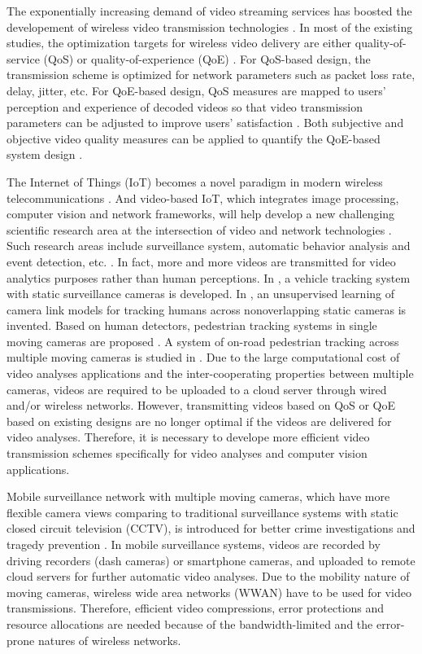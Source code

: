 \documentclass[journal]{IEEEtran}
\begin{document}
The exponentially increasing demand of video streaming services has boosted the developement of wireless video transmission technologies \cite{Hwan09}. In most of the existing studies, the optimization targets for wireless video delivery are either quality-of-service (QoS) \cite{Hwan09,EhHa12,KPKG15} or quality-of-experience (QoE) \cite{CHLC15,CHWL14,CDHR15,SHJE13,YaFA15}. For QoS-based design, the transmission scheme is optimized for network parameters such as packet loss rate, delay, jitter, etc. For QoE-based design, QoS measures are mapped to users' perception and experience of decoded videos so that video transmission parameters can be adjusted to improve users' satisfaction \cite{FiHT10}. Both subjective and objective video quality measures can be applied to quantify the QoE-based system design \cite{MSSB10}.

The Internet of Things (IoT) becomes a novel paradigm in modern wireless telecommunications \cite{AtIM10}. And video-based IoT, which integrates image processing, computer vision and network frameworks, will help develop a new challenging scientific research area at the intersection of video and network technologies \cite{GBMP13}. Such research areas include surveillance system, automatic behavior analysis and event detection, etc. \cite{GBMP13}. In fact, more and more videos are transmitted for video analytics purposes rather than human perceptions. In \cite{LeHC15}, a vehicle tracking system with static surveillance cameras is developed. In \cite{ChHw14}, an unsupervised learning of camera link models for tracking humans across nonoverlapping static cameras is invented. Based on human detectors, pedestrian tracking systems in single moving cameras are proposed \cite{LHOP14,HWLH15}. A system of on-road pedestrian tracking across multiple moving cameras is studied in \cite{LeHw15}. Due to the large computational cost of video analyses applications and the inter-cooperating properties between multiple cameras, videos are required to be uploaded to a cloud server through wired and/or wireless networks. However, transmitting videos based on QoS or QoE based on existing designs are no longer optimal if the videos are delivered for video analyses. Therefore, it is necessary to develope more efficient video transmission schemes specifically for video analyses and computer vision applications. 

Mobile surveillance network with multiple moving cameras, which have more flexible camera views comparing to traditional surveillance systems with static closed circuit television (CCTV), is introduced for better crime investigations and tragedy prevention \cite{LeHw15}. In mobile surveillance systems, videos are recorded by driving recorders (dash cameras) or smartphone cameras, and uploaded to remote cloud servers for further automatic video analyses. Due to the mobility nature of moving cameras, wireless wide area networks (WWAN) have to be used for video transmissions. Therefore, efficient video compressions, error protections and resource allocations are needed because of the bandwidth-limited and the error-prone natures of wireless networks. 
\end{document}
